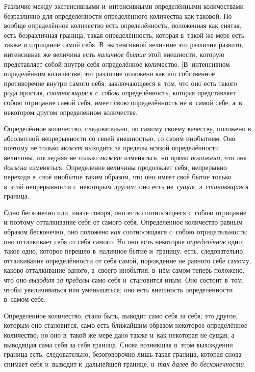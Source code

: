 Различие между экстенсивными и~интенсивными определёнными количествами
безразлично для определённости определённого количества как таковой. Но вообще
определённое количество есть определённость, положенная как снятая, есть
безразличная граница, такая определённость, которая в~такой же мере есть также
и отрицание самой себя. В~экстенсивной величине это различие развито,
интенсивная же величина есть {\em наличное бытие} этой внешности, которую
представляет собой внутри себя определённое количество. [В~интенсивном
определённом количестве] это различие положено как его собственное противоречие
внутри самого себя, заключающееся в~том, что оно есть такого рода простая,
{\em соотносящаяся с~собою} определённость, которая представляет собою
отрицание самой себя, имеет свою определённость не в~самой себе, а~в некотором другом
определённом количестве.

Определённое количество, следовательно, по самому своему качеству, положено
в абсолютной непрерывности со своей внешностью, со своим инобытием. Оно поэтому
не только {\em может} выходить за пределы всякой определённости величины,
последняя не только {\em может} изменяться, но прямо {\em положено,} что она
{\em должна} изменяться. Определение величины продолжает себя,
непрерывно переходя в~своё инобытие таким образом, что оно имеет своё бытие
только в~этой непрерывности с~некоторым другим; оно есть не~{\em сущая,}
а~{\em становящаяся} граница.

Одно бесконечно или, иначе говоря, оно есть соотносящееся с~собою отрицание и
поэтому отталкивание себя от самого себя. Определённое количество равным
образом бесконечно, оно положено {\em как} соотносящаяся с~собою отрицательность; оно
отталкивает себя от себя самого. Но оно есть некоторое {\em определённое} одно;
такое одно, которое перешло в~наличное бытие и~границу, есть, следовательно,
отталкивание определённости от себя самой, порождение не равного себе самому,
каково отталкивание одного, а~своего инобытия; в~нём самом теперь положено, что
оно {\em выводит за пределы} само себя и~становится иным. Оно состоит в~том, чтобы
увеличиваться или уменьшаться; оно есть внешность определённости в~самом себе.

Определённое количество, стало быть, выводит само себя за себя; это другое,
которым оно становится, само есть ближайшим образом некоторое определённое
количество; но оно в~такой же мере дано также и~как некоторая не сущая, а
выводящая сама себя за себя граница. Снова возникшая в~этом выхождении граница
есть, следовательно, безоговорочно лишь такая граница, которая снова снимает
себя и~выводит к~дальнейшей границе, {\em и~так далее до бесконечности}.

